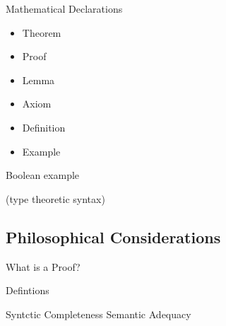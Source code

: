 \documentclass{beamer}
\begin{document}
\begin{frame}
\begin{block}{Mathematical Declarations}
  \begin{itemize}
    \item Theorem
    \item Proof
    \item Lemma
    \item Axiom
    \item Definition
    \item Example 
  \end{itemize}
\end{block}
\end{frame}

\begin{frame}
Boolean example

(type theoretic syntax)

\end{frame}

\subsection{Philosophical Considerations}


\begin{frame}

  What is a Proof?
  
\end{frame}

\begin{frame}

  Defintions

  Syntctic Completeness
  Semantic Adequacy

\end{frame}
\end{document}
